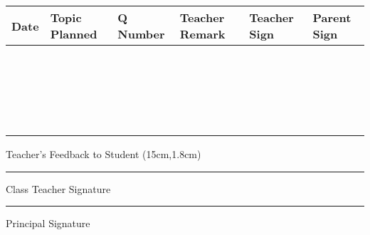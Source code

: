 \documentclass[12pt,a4paper]{article}%
\begin{document}
\begin{longtable}{| l | l| l | l | l | l |}%
\hline%
Date&Topic Planned&Q Number&Teacher Remark&Teacher Sign&Parent Sign\\[1.5ex]%
\hline%
\endhead%
\hline%
 & & & & & \\[1.5ex]%
\hline%
 & & & & & \\[1.5ex]%
\hline%
 & & & & & \\[1.5ex]%
\hline%
 & & & & & \\[1.5ex]%
\hline%
 & & & & & \\[1.5ex]%
\hline%
 & & & & & \\[1.5ex]%
\hline%
 & & & & & \\[1.5ex]%
\hline%
 & & & & & \\[1.5ex]%
\hline%
 & & & & & \\[1.5ex]%
\hline%
 & & & & & \\[1.5ex]%
\hline%
 & & & & & \\[1.5ex]%
\hline%
 & & & & & \\[1.5ex]%
\hline%
 & & & & & \\[1.5ex]%
\hline%
 & & & & & \\[1.5ex]%
\hline%
 & & & & & \\[1.5ex]%
\hline%
 & & & & & \\[1.5ex]%
\hline%
 & & & & & \\[1.5ex]%
\hline%
 & & & & & \\[1.5ex]%
\hline%
 & & & & & \\[1.5ex]%
\hline%
 & & & & & \\[1.5ex]%
\hline%
 & & & & & \\[1.5ex]%
\hline%
\end{longtable}%
Teacher's Feedback to Student%
\linebreak%
\linebreak%
\framebox(15cm,1.8cm){}
\linebreak%
\linebreak%
\linebreak%
\linebreak%
\begin{minipage}[l]{0.45\textwidth}%
\flushleft%
\centering%
\par\noindent\rule{40mm}{0.4pt} \linebreak Class Teacher Signature%
\end{minipage}%
\begin{minipage}[l]{0.45\textwidth}%
\flushleft%
\centering%
\par\noindent\rule{40mm}{0.4pt} \linebreak Principal Signature%
\end{minipage}%
\newpage%
\end{document}

